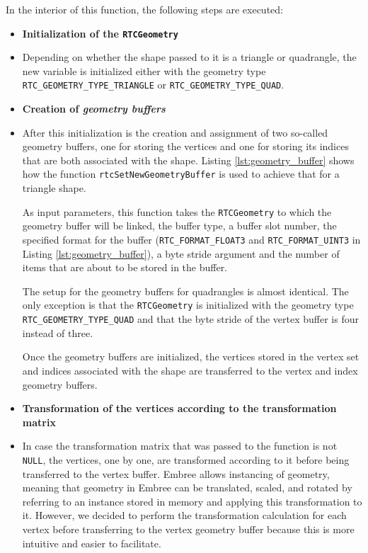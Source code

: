 In the interior of this function, the following steps are executed:

\begin{itemize}
	\setlength\itemsep{0.05em}
	
	\item \textbf{Initialization of the \texttt{RTCGeometry}}
	\item[] Depending on whether the shape passed to it is a triangle or quadrangle, the new  variable is initialized either with the geometry type \texttt{RTC\_GEOMETRY\_TYPE\_TRIANGLE} or \texttt{RTC\_GEOMETRY\_TYPE\_QUAD}.
	\\
	
	\item \textbf{Creation of \emph{geometry buffers}}
	\item[] After this initialization is the creation and assignment of two so-called geometry buffers, one for storing the vertices and one for storing its indices that are both associated with the shape. Listing \ref{lst:geometry_buffer} shows how the function \texttt{rtcSetNewGeometryBuffer} is used to achieve that for a triangle shape.
	
	As input parameters, this function takes the \texttt{RTCGeometry} to which the geometry buffer will be linked, the buffer type, a buffer slot number, the specified format for the buffer (\texttt{RTC\_FORMAT\_FLOAT3} and \texttt{RTC\_FORMAT\_UINT3} in Listing \ref{lst:geometry_buffer}), a byte stride argument and the number of items that are about to be stored in the buffer. 
	
	The setup for the geometry buffers for quadrangles is almost identical. The only exception is that the \texttt{RTCGeometry} is initialized with the geometry type \texttt{RTC\_GEOMETRY\_TYPE\_QUAD} and that the byte stride of the vertex buffer is four instead of three.
	
	Once the geometry buffers are initialized, the vertices stored in the vertex set and indices associated with the shape are transferred to the vertex and index geometry buffers.
	\\
	
	\item \textbf{Transformation of the vertices according to the transformation matrix}
	\item[] In case the transformation matrix that was passed to the function is not \texttt{NULL}, the vertices, one by one, are transformed according to it before being transferred to the vertex buffer. Embree allows instancing of geometry, meaning that geometry in Embree can be translated, scaled, and rotated by referring to an instance stored in memory and applying this transformation to it. However, we decided to perform the transformation calculation for each vertex before transferring to the vertex geometry buffer because this is more intuitive and easier to facilitate.
	
\end{itemize}

